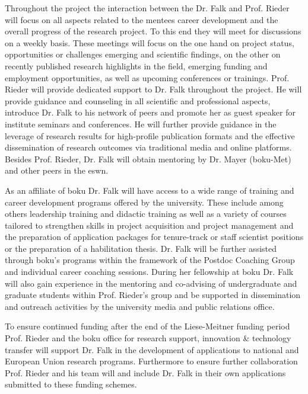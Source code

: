 Throughout the project the interaction between the Dr. Falk and Prof. Rieder will focus on all aspects related to the mentees career development and the overall progress of the research project. To this end they will meet for discussions on a weekly basis. These meetings will focus on the one hand on project status, opportunities or challenges emerging and scientific findings, on the other on recently published research highlights in the field, emerging funding and employment opportunities, as well as upcoming conferences or trainings. Prof. Rieder will provide dedicated support to Dr. Falk throughout the project. He will provide guidance and counseling in all scientific and professional aspects, introduce Dr. Falk to his network of peers and promote her as guest speaker for institute seminars and conferences. He will further provide guidance in the leverage of research results for high-profile publication formats and the effective dissemination of research outcomes via traditional media and online platforms. Besides Prof. Rieder, Dr. Falk will obtain mentoring by Dr. Mayer (\gls{boku}-Met) and other peers in the \gls{eswn}.

As an affiliate of \gls{boku} Dr. Falk will have access to a wide range of training and career development programs offered by the university. These include among others leadership training and didactic training as well as a variety of courses tailored to strengthen skills in project acquisition and project management and the preparation of application packages for tenure-track or staff scientist positions or the preparation of a habilitation thesis. Dr. Falk will be further assisted through \gls{boku}’s programs within the framework of the Postdoc Coaching Group and individual career coaching sessions. During her fellowship at \gls{boku} Dr. Falk will also gain experience in the mentoring and co-advising of undergraduate and graduate students within Prof. Rieder’s group and be supported in dissemination and outreach activities by the university media and public relations office.

To ensure continued funding after the end of the Liese-Meitner funding period Prof. Rieder and the \gls{boku} office for research support, innovation \& technology transfer will support Dr. Falk in the development of applications to national and European Union research programs. Furthermore to ensure further collaboration Prof. Rieder and his team will and include Dr. Falk in their own applications submitted to these funding schemes.     
